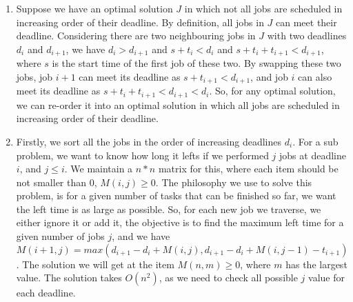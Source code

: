 \documentclass[paper=a4, fontsize=11pt]{scrartcl} %
\numberwithin{equation}{section} %
\numberwithin{figure}{section} %
\numberwithin{table}{section} %
\newcommand{\nop}[1]{}
\begin{document}
\begin{enumerate}[label={(\alph*)}]

\item

Suppose we have an optimal solution $J$ in which not all jobs are scheduled in increasing order of their deadline. By definition, all jobs in $J$ can meet their deadline. Considering there are two neighbouring jobs in $J$ with two deadlines $d_i$ and $d_{i+1}$, we have $d_i > d_{i+1}$ and $s+t_i < d_i$ and $s+t_i+t_{i+1} < d_{i+1}$, where $s$ is the start time of the first job of these two. By swapping these two jobs, job $i+1$ can meet its deadline as $s+t_{i+1} < d_{i+1}$, and job $i$ can also meet its deadline as $s+t_i+t_{i+1} < d_{i+1} < d_i$. So, for any optimal solution, we can re-order it into an optimal solution in which all jobs are scheduled in increasing order of their deadline. 

\item
\nop{
Firstly, we sort all the jobs according to their required time $t_i$, such that we can check the order of job $i$. It takes us $O(nlogn)$. 
}

Firstly, we sort all the jobs in the order of increasing deadlines $d_i$. For a sub problem, we want to know how long it lefts if we performed $j$ jobs at deadline $i$, and $j \leq i$. We maintain a $n*n$ matrix for this, where each item should be not smaller than $0$, $M(i, j) \geq 0$. The philosophy we use to solve this problem, is for a given number of tasks that can be finished so far, we want the left time is as large as possible. So, for each new job we traverse, we either ignore it or add it, the objective is to find the maximum left time for a given number of jobs $j$, and we have $M(i+1, j) = max(d_{i+1} - d_i + M(i, j), d_{i+1} - d_i + M(i, j -1) - t_{i+1})$. The solution we will get at the item $M(n, m) \geq 0$, where $m$ has the largest value. The solution takes $O(n^2)$, as we need to check all possible $j$ value for each deadline. 

\end{enumerate}
\end{document}
